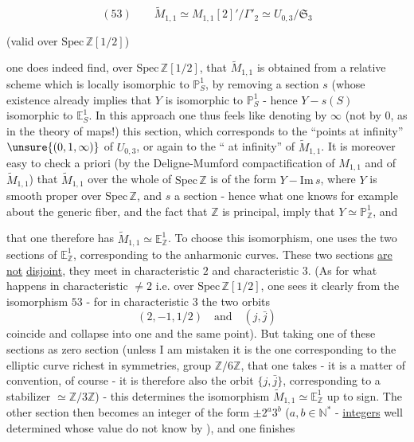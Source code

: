 
\[
(53)\qquad
\widetilde M_{1,1}\simeq M_{1,1}[2]'/\Gamma'_2
\simeq U_{0,3}/\mathfrak S_3
\]

\qquad
(valid over $\mathrm{Spec}\,\mathbb Z[1/2]$)

one does indeed find, over $\mathrm{Spec}\,\mathbb Z[1/2]$, that
$\widetilde M_{1,1}$ is obtained from a relative scheme  which is
 locally  isomorphic to $\mathbb P^1_S$,
by removing a section $s$ (whose existence already implies that $Y$ is
 isomorphic to $\mathbb P^1_S$ - hence
$Y-s(S)$ isomorphic to $\mathbb E^1_S$.
In this approach one thus feels like denoting by $\infty$
(not by $0$, as in the theory of maps!) this section,
which corresponds to the ``points at infinity'' $\unsure{(0,1,\infty)}$ of
$U_{0,3}$, or again to the `` at infinity'' of
$\widetilde M_{1,1}$.
It is moreover easy to check a priori 
(by the Deligne-Mumford compactification of $M_{1,1}$ and of
$\widetilde M_{1,1}$) that $\widetilde M_{1,1}$ over the whole of $\mathrm{Spec}\,\mathbb Z$
is of the form $Y-\mathrm{Im}\,s$, where $Y$ is smooth proper
over $\mathrm{Spec}\,\mathbb Z$, and $s$ a section - hence what one
knows for example about the generic fiber, and the fact that $\mathbb Z$ is
principal, imply that $Y\simeq\mathbb P^1_{\mathbb Z}$, and


that one therefore has $\widetilde M_{1,1}\simeq\mathbb E^1_{\mathbb Z}$.
To  choose this isomorphism, one uses the two sections of
$\mathbb E^1_{\mathbb Z}$, corresponding to the anharmonic curves.
These two sections \uline{are not} \uline{disjoint}, they
meet in characteristic $2$ and characteristic $3$.
(As for what happens in characteristic $\ne 2$ i.e. over
$\mathrm{Spec}\,\mathbb Z[1/2]$, one sees it clearly from the isomorphism $53$ -
 for in characteristic $3$ the two orbits
\[
(2,-1,1/2)\quad\text{and}\quad(j,\bar j)
\]
coincide and collapse into one and the
same point).
But taking one of these sections as zero section
(unless I am mistaken it is the one corresponding to the elliptic curve richest
in symmetries,   group $\mathbb Z/6\mathbb Z$, that one takes -
it is a matter of convention, of course - it is therefore also the orbit
$\{j,\bar j\}$, corresponding to a stabilizer
$\simeq\mathbb Z/3\mathbb Z$) - this determines the isomorphism
$\widetilde M_{1,1}\simeq\mathbb E^1_{\mathbb Z}$ up to sign.
The other section then becomes an integer of the form
$\pm 2^a3^b$ ($a,b\in\mathbb N^*$ - \uline{integers} well determined whose
value  do not know by ), and one finishes

